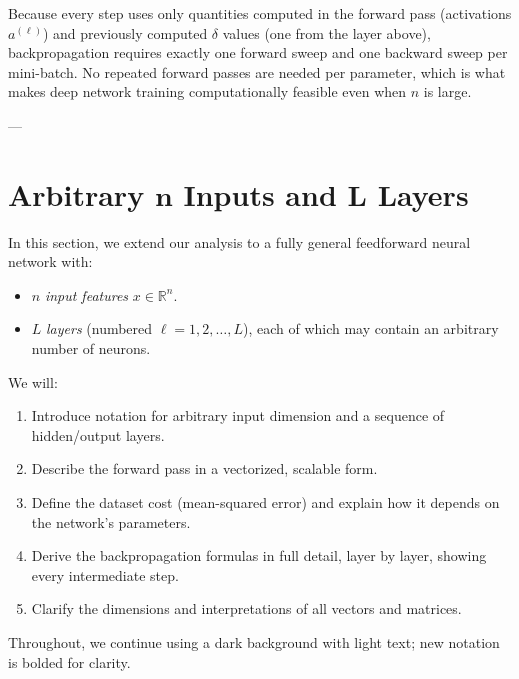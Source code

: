 \documentclass{article}
\begin{document}
\vspace{0.5em}
\noindent Because every step uses only quantities computed in the forward pass (activations \(a^{(\ell)}\)) and previously computed \(\delta\) values (one from the layer above), backpropagation requires exactly one forward sweep and one backward sweep per mini-batch.  No repeated forward passes are needed per parameter, which is what makes deep network training computationally feasible even when \(n\) is large.

---


\section{Arbitrary \(\boldsymbol{n}\) Inputs and \(\boldsymbol{L}\) Layers}\label{sec:n-inputs-layers}

\noindent In this section, we extend our analysis to a fully general feedforward neural network with:
\begin{itemize}
    \item \(n\) \emph{input features} \(x \in \mathbb{R}^n\).
    \item \(L\) \emph{layers} (numbered \(\ell = 1,2,\dots,L\)), each of which may contain an arbitrary number of neurons.
\end{itemize}
We will:
\begin{enumerate}
    \item Introduce notation for arbitrary input dimension and a sequence of hidden/output layers.
    \item Describe the forward pass in a vectorized, scalable form.
    \item Define the dataset cost (mean-squared error) and explain how it depends on the network's parameters.
    \item Derive the backpropagation formulas in full detail, layer by layer, showing every intermediate step.
    \item Clarify the dimensions and interpretations of all vectors and matrices.
\end{enumerate}

\medskip
\noindent Throughout, we continue using a dark background with light text; new notation is bolded for clarity.

\end{document}
